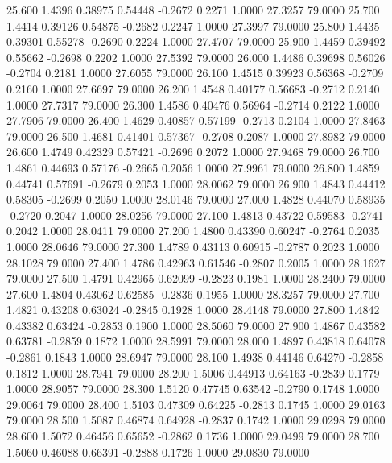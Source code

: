  25.600   1.4396   0.38975   0.54448  -0.2672   0.2271   1.0000  27.3257  79.0000
  25.700   1.4414   0.39126   0.54875  -0.2682   0.2247   1.0000  27.3997  79.0000
  25.800   1.4435   0.39301   0.55278  -0.2690   0.2224   1.0000  27.4707  79.0000
  25.900   1.4459   0.39492   0.55662  -0.2698   0.2202   1.0000  27.5392  79.0000
  26.000   1.4486   0.39698   0.56026  -0.2704   0.2181   1.0000  27.6055  79.0000
  26.100   1.4515   0.39923   0.56368  -0.2709   0.2160   1.0000  27.6697  79.0000
  26.200   1.4548   0.40177   0.56683  -0.2712   0.2140   1.0000  27.7317  79.0000
  26.300   1.4586   0.40476   0.56964  -0.2714   0.2122   1.0000  27.7906  79.0000
  26.400   1.4629   0.40857   0.57199  -0.2713   0.2104   1.0000  27.8463  79.0000
  26.500   1.4681   0.41401   0.57367  -0.2708   0.2087   1.0000  27.8982  79.0000
  26.600   1.4749   0.42329   0.57421  -0.2696   0.2072   1.0000  27.9468  79.0000
  26.700   1.4861   0.44693   0.57176  -0.2665   0.2056   1.0000  27.9961  79.0000
  26.800   1.4859   0.44741   0.57691  -0.2679   0.2053   1.0000  28.0062  79.0000
  26.900   1.4843   0.44412   0.58305  -0.2699   0.2050   1.0000  28.0146  79.0000
  27.000   1.4828   0.44070   0.58935  -0.2720   0.2047   1.0000  28.0256  79.0000
  27.100   1.4813   0.43722   0.59583  -0.2741   0.2042   1.0000  28.0411  79.0000
  27.200   1.4800   0.43390   0.60247  -0.2764   0.2035   1.0000  28.0646  79.0000
  27.300   1.4789   0.43113   0.60915  -0.2787   0.2023   1.0000  28.1028  79.0000
  27.400   1.4786   0.42963   0.61546  -0.2807   0.2005   1.0000  28.1627  79.0000
  27.500   1.4791   0.42965   0.62099  -0.2823   0.1981   1.0000  28.2400  79.0000
  27.600   1.4804   0.43062   0.62585  -0.2836   0.1955   1.0000  28.3257  79.0000
  27.700   1.4821   0.43208   0.63024  -0.2845   0.1928   1.0000  28.4148  79.0000
  27.800   1.4842   0.43382   0.63424  -0.2853   0.1900   1.0000  28.5060  79.0000
  27.900   1.4867   0.43582   0.63781  -0.2859   0.1872   1.0000  28.5991  79.0000
  28.000   1.4897   0.43818   0.64078  -0.2861   0.1843   1.0000  28.6947  79.0000
  28.100   1.4938   0.44146   0.64270  -0.2858   0.1812   1.0000  28.7941  79.0000
  28.200   1.5006   0.44913   0.64163  -0.2839   0.1779   1.0000  28.9057  79.0000
  28.300   1.5120   0.47745   0.63542  -0.2790   0.1748   1.0000  29.0064  79.0000
  28.400   1.5103   0.47309   0.64225  -0.2813   0.1745   1.0000  29.0163  79.0000
  28.500   1.5087   0.46874   0.64928  -0.2837   0.1742   1.0000  29.0298  79.0000
  28.600   1.5072   0.46456   0.65652  -0.2862   0.1736   1.0000  29.0499  79.0000
  28.700   1.5060   0.46088   0.66391  -0.2888   0.1726   1.0000  29.0830  79.0000
